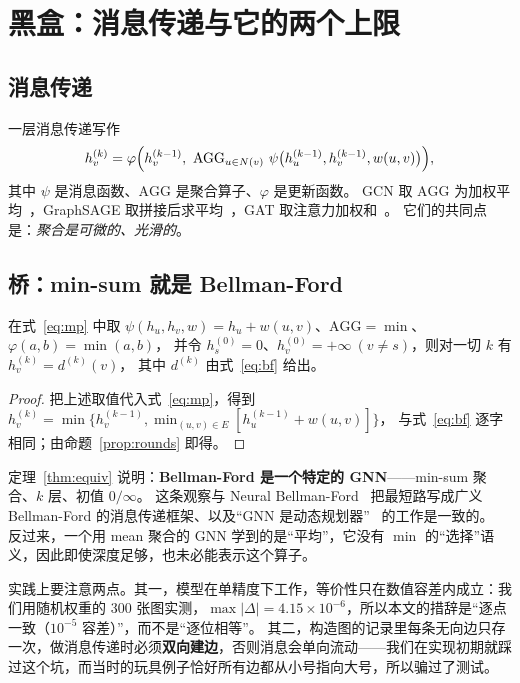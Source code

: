 ﻿\section{黑盒：消息传递与它的两个上限}\label{sec:black}

\subsection{消息传递}

一层消息传递写作
\begin{equation}
h_v^{(k)}=\varphi\Bigl(h_v^{(k-1)},\ \mathrm{AGG}_{u\in N(v)}\ \psi\bigl(h_u^{(k-1)},h_v^{(k-1)},w(u,v)\bigr)\Bigr),
\label{eq:mp}
\end{equation}
其中 $\psi$ 是消息函数、$\mathrm{AGG}$ 是聚合算子、$\varphi$ 是更新函数。
GCN 取 $\mathrm{AGG}$ 为加权平均~\cite{kipf2017gcn}，GraphSAGE 取拼接后求平均~\cite{hamilton2017graphsage}，GAT 取注意力加权和~\cite{velickovic2018gat}。
它们的共同点是：\emph{聚合是可微的、光滑的}。

\subsection{桥：min-sum 就是 Bellman-Ford}

\begin{theorem}[等价性]\label{thm:equiv}
在式~\eqref{eq:mp} 中取 $\psi(h_u,h_v,w)=h_u+w(u,v)$、$\mathrm{AGG}=\min$、$\varphi(a,b)=\min(a,b)$，
并令 $h^{(0)}_s=0$、$h^{(0)}_v=+\infty\ (v\ne s)$，则对一切 $k$ 有 $h^{(k)}_v=d^{(k)}(v)$，
其中 $d^{(k)}$ 由式~\eqref{eq:bf} 给出。
\end{theorem}
\begin{proof}
把上述取值代入式~\eqref{eq:mp}，得到
$h_v^{(k)}=\min\bigl\{h_v^{(k-1)},\min_{(u,v)\in E}[h_u^{(k-1)}+w(u,v)]\bigr\}$，
与式~\eqref{eq:bf} 逐字相同；由命题~\ref{prop:rounds} 即得。
\end{proof}

定理~\ref{thm:equiv} 说明：\textbf{Bellman-Ford 是一个特定的 GNN}——min-sum 聚合、$k$ 层、初值 $0/\infty$。
这条观察与 Neural Bellman-Ford~\cite{zhu2021neuralbf} 把最短路写成广义 Bellman-Ford 的消息传递框架、以及“GNN 是动态规划器”~\cite{dudzik2022dp} 的工作是一致的。
反过来，一个用 mean 聚合的 GNN 学到的是“平均”，它没有 $\min$ 的“选择”语义，因此即使深度足够，也未必能表示这个算子。

实践上要注意两点。其一，模型在单精度下工作，等价性只在数值容差内成立：我们用随机权重的 300 张图实测，$\max|\Delta|=4.15\times10^{-6}$，所以本文的措辞是“逐点一致（$10^{-5}$ 容差）”，而不是“逐位相等”。
其二，构造图的记录里每条无向边只存一次，做消息传递时必须\textbf{双向建边}，否则消息会单向流动——我们在实现初期就踩过这个坑，而当时的玩具例子恰好所有边都从小号指向大号，所以骗过了测试。

